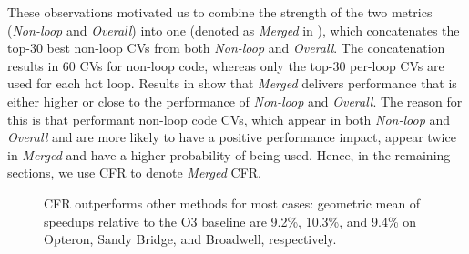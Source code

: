 These observations motivated us to combine the strength of the two metrics
(\emph{Non-loop} and \emph{Overall}) into one (denoted as
\emph{Merged} in ), which concatenates the
top-30 best non-loop CVs from both \emph{Non-loop} and \emph{Overall}.
The concatenation results in 60 CVs for non-loop code, whereas only
the top-30 per-loop CVs are used for each hot loop.  Results in
 show that \emph{Merged} delivers performance that
is either higher or close to the performance of \emph{Non-loop} and \emph{Overall}.  The reason for
this is that performant non-loop code CVs, which appear in both
\emph{Non-loop} and \emph{Overall} and are more likely to have a
positive performance impact, appear twice in \emph{Merged} and have a
higher probability of being used. Hence, in the remaining sections, we use
CFR to denote \emph{Merged} CFR.




\begin{figure}
\vspace{-1em}
\vspace{-1em}
\caption{CFR outperforms other methods for most cases: geometric mean of
speedups relative to the O3 baseline are 9.2\%, 10.3\%, and 9.4\% on
Opteron, Sandy Bridge, and Broadwell, respectively.}
\label{fig:results}
\end{figure}


